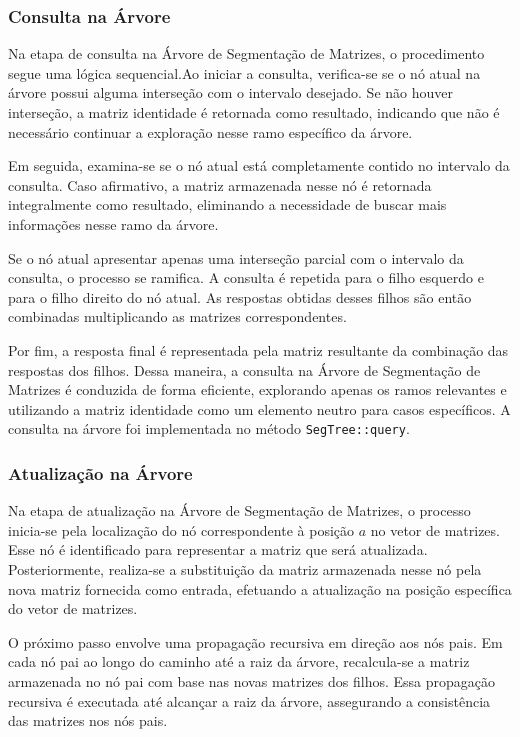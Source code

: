 \documentclass{article}
\begin{document}
\subsubsection{Consulta na Árvore}

Na etapa de consulta na Árvore de Segmentação de Matrizes, o procedimento segue uma lógica sequencial.Ao iniciar a consulta, verifica-se se o nó atual na árvore possui alguma interseção com o intervalo desejado. Se não houver interseção, a matriz identidade é retornada como resultado, indicando que não é necessário continuar a exploração nesse ramo específico da árvore.

Em seguida, examina-se se o nó atual está completamente contido no intervalo da consulta. Caso afirmativo, a matriz armazenada nesse nó é retornada integralmente como resultado, eliminando a necessidade de buscar mais informações nesse ramo da árvore.

Se o nó atual apresentar apenas uma interseção parcial com o intervalo da consulta, o processo se ramifica. A consulta é repetida para o filho esquerdo e para o filho direito do nó atual. As respostas obtidas desses filhos são então combinadas multiplicando as matrizes correspondentes.

Por fim, a resposta final é representada pela matriz resultante da combinação das respostas dos filhos. Dessa maneira, a consulta na Árvore de Segmentação de Matrizes é conduzida de forma eficiente, explorando apenas os ramos relevantes e utilizando a matriz identidade como um elemento neutro para casos específicos. A consulta na árvore foi implementada no método \texttt{SegTree::query}.

\subsubsection{Atualização na Árvore}

Na etapa de atualização na Árvore de Segmentação de Matrizes, o processo inicia-se pela localização do nó correspondente à posição $a$ no vetor de matrizes. Esse nó é identificado para representar a matriz que será atualizada. Posteriormente, realiza-se a substituição da matriz armazenada nesse nó pela nova matriz fornecida como entrada, efetuando a atualização na posição específica do vetor de matrizes.

O próximo passo envolve uma propagação recursiva em direção aos nós pais. Em cada nó pai ao longo do caminho até a raiz da árvore, recalcula-se a matriz armazenada no nó pai com base nas novas matrizes dos filhos. Essa propagação recursiva é executada até alcançar a raiz da árvore, assegurando a consistência das matrizes nos nós pais.
\end{document}
